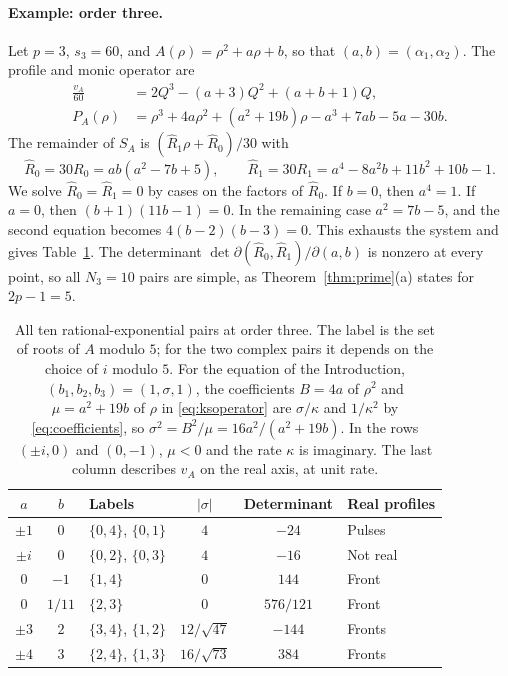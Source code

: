 \paragraph{Example: order three.}\label{sec:ks-rational}
Let \(p=3\), \(s_3=60\), and \(A(\rho)=\rho^2+a\rho+b\), so that
\((a,b)=(\alpha_1,\alpha_2)\). The profile and monic operator are
\begin{align}
 \frac{v_A}{60}&=2Q^3-(a+3)Q^2+(a+b+1)Q, \label{eq:ksprofile}\\
 P_A(\rho)&=\rho^3+4a\rho^2+(a^2+19b)\rho-a^3+7ab-5a-30b.
   \label{eq:ksoperator}
\end{align}
The remainder of \(S_A\) is \((\widehat R_1\rho+\widehat R_0)/30\) with
\begin{equation}\label{eq:ksmatching}
 \widehat R_0=30R_0=ab(a^2-7b+5),\qquad
 \widehat R_1=30R_1=a^4-8a^2b+11b^2+10b-1.
\end{equation}
We solve \(\widehat R_0=\widehat R_1=0\) by cases on the factors of
\(\widehat R_0\). If \(b=0\), then \(a^4=1\). If \(a=0\), then
\((b+1)(11b-1)=0\). In the remaining case \(a^2=7b-5\), and the second
equation becomes \(4(b-2)(b-3)=0\). This exhausts the system and gives
Table~\ref{tab:ks}. The determinant
\(\det\partial(\widehat R_0,\widehat R_1)/\partial(a,b)\) is nonzero at
every point, so all \(N_3=10\) pairs are simple, as
Theorem~\ref{thm:prime}(a) states for \(2p-1=5\).

\begin{table}[htbp]
\centering
\caption{All ten rational-exponential pairs at order three. The label
is the set of roots of \(A\) modulo \(5\); for the two complex pairs it
depends on the choice of \(i\) modulo \(5\). For the equation of the
Introduction, \((b_1,b_2,b_3)=(1,\sigma,1)\), the coefficients \(B=4a\)
of \(\rho^2\) and \(\mu=a^2+19b\) of \(\rho\) in \eqref{eq:ksoperator}
are \(\sigma/\kappa\) and \(1/\kappa^2\) by \eqref{eq:coefficients}, so
\(\sigma^2=B^2/\mu=16a^2/(a^2+19b)\). In the rows \((\pm i,0)\) and
\((0,-1)\), \(\mu<0\) and the rate \(\kappa\) is imaginary. The last
column describes \(v_A\) on the real axis, at unit rate.}
\label{tab:ks}
\begin{tabular}{@{}cclccl@{}}
\toprule
\(a\)&\(b\)&Labels&\(|\sigma|\)&Determinant&Real profiles\\
\midrule
\(\pm1\)&\(0\)&\(\{0,4\}\), \(\{0,1\}\)&\(4\)&\(-24\)&Pulses\\
\(\pm i\)&\(0\)&\(\{0,2\}\), \(\{0,3\}\)&\(4\)&\(-16\)&Not real\\
\(0\)&\(-1\)&\(\{1,4\}\)&\(0\)&\(144\)&Front\\
\(0\)&\(1/11\)&\(\{2,3\}\)&\(0\)&\(576/121\)&Front\\
\(\pm3\)&\(2\)&\(\{3,4\}\), \(\{1,2\}\)&\(12/\sqrt{47}\)&\(-144\)&Fronts\\
\(\pm4\)&\(3\)&\(\{2,4\}\), \(\{1,3\}\)&\(16/\sqrt{73}\)&\(384\)&Fronts\\
\bottomrule
\end{tabular}
\end{table}

